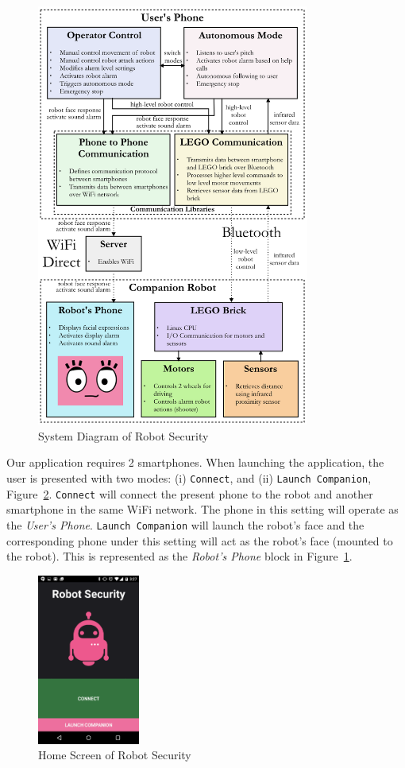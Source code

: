 \documentclass[12pt]{article}
\begin{document}
\begin{figure}[!htbp]
    \centering
    \includegraphics[width=0.8\textwidth]{system.png}
    \caption{System Diagram of Robot Security}
    \label{system}
\end{figure}

Our application requires 2 smartphones. When launching the application, the user is presented with two modes: (i) \texttt{Connect}, and (ii) \texttt{Launch Companion}, Figure~\ref{home}. \texttt{Connect} will connect the present phone to the robot and another smartphone in the same WiFi network. The phone in this setting will operate as the \textit{User's Phone}. \texttt{Launch Companion} will launch the robot's face and the corresponding phone under this setting will act as the robot's face (mounted to the robot). This is represented as the \textit{Robot's Phone} block in Figure~\ref{system}.

\begin{figure}[!htbp]
    \centering
    \includegraphics[width=0.3\textwidth]{home.png}
    \caption{Home Screen of Robot Security}
    \label{home}
\end{figure}
\end{document}

